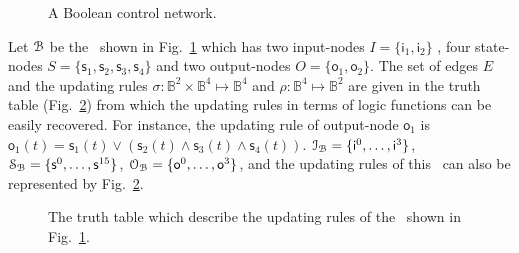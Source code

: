 \begin{example}
\begin{figure}[thpb]
		\caption{A Boolean control network. }%
		\label{fig:1}
	\end{figure}
%	
Let ${\mathcal{B}}$ be the \BCN\  shown in Fig.~\ref{fig:1} which has two  input-nodes $I=\{\mathsf{i}_1,\mathsf{i}_2\}$ , four state-nodes $S=\{\mathsf{s}_1, \mathsf{s}_2,\mathsf{s}_3, \mathsf{s}_4\}$ and two output-nodes $O=\{\mathsf{o}_1,\mathsf{o}_2\}$. The set of edges $E$ and 
the updating rules $\sigma: \mathbb{B}^{2}\times \mathbb{B}^{4}\mapsto \mathbb{B}^4$ and $\rho:\mathbb{B}^4\mapsto \mathbb{B}^2$ are given in the truth table (Fig.~\ref{fig:2}) from which the updating rules in terms of logic functions can be easily recovered.   For instance, %
the updating rule of output-node $\mathsf{o}_1$ is 
$\mathsf{o}_1(t)=\mathsf{s}_1(t)\vee {({\mathsf{s}_2}(t)\wedge { \mathsf{s}_3}(t)\wedge {\mathsf{s}_4}(t))}$. $\mathcal{I}_{\mathcal{B}}=\{\mathsf{i}^0,\ldots,\mathsf{i}^{3}\}$,  
 $\mathcal{S}_{\mathcal{B}}=\{\mathsf{s}^0,\ldots,\mathsf{s}^{15}\}$,  
 $\mathcal{O}_{\mathcal{B}}=\{\mathsf{o}^0,\ldots,\mathsf{o}^{3}\}$, and the updating rules of this \BCN\ can also be represented by Fig.~\ref{fig:2}.
 \begin{figure}[thpb]
	\centering
	\caption{The truth table which describe the updating rules of the \BCN\ shown in Fig.~\ref{fig:1}.}
	\label{fig:2}
\end{figure}
\end{example}   

